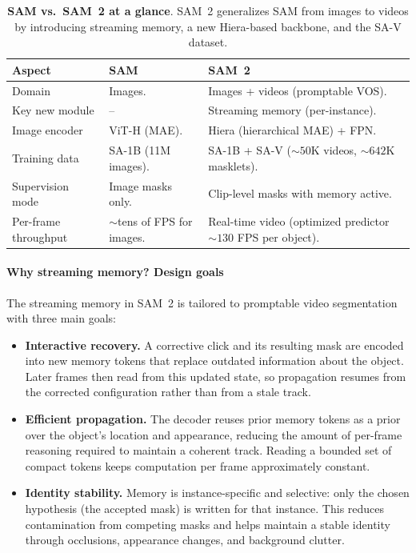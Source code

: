 \begin{enrichment}
\begin{enrichment}
		\begin{table}[H]
			\centering
			\caption{\textbf{SAM vs.\ SAM~2 at a glance}. SAM~2 generalizes SAM from images to videos by introducing streaming memory, a new Hiera-based backbone, and the SA-V dataset.}
			\label{tab:chapter15_sam_vs_sam2}
			\begin{tabular}{p{}p{0.32\textwidth}p{}}
				\toprule
				\textbf{Aspect} & \textbf{SAM~\cite{kirillov2023_sam}} & \textbf{SAM~2~\cite{ravi2024_sam2}} \\
				\midrule
				Domain & Images. & Images + videos (promptable VOS). \\
				Key new module & -- & Streaming memory (per-instance). \\
				Image encoder & ViT-H (MAE). & Hiera (hierarchical MAE) + FPN. \\
				Training data & SA-1B (11M images). & SA-1B + SA-V (\(\sim 50\)K videos, \(\sim 642\)K masklets). \\
				Supervision mode & Image masks only. & Clip-level masks with memory active. \\
				Per-frame throughput & \(\sim\)tens of FPS for images. & Real-time video (optimized predictor \(\sim 130\) FPS per object). \\
				\bottomrule
			\end{tabular}
		\end{table}
		
		\paragraph{Why streaming memory? Design goals}
		The streaming memory in SAM~2 is tailored to promptable video segmentation with three main goals:
		\begin{itemize}
			\item \textbf{Interactive recovery.} A corrective click and its resulting mask are encoded into new memory tokens that replace outdated information about the object. Later frames then read from this updated state, so propagation resumes from the corrected configuration rather than from a stale 
			track.
			
			\newpage
			
			\item \textbf{Efficient propagation.} The decoder reuses prior memory tokens as a prior over the object’s location and appearance, reducing the amount of per-frame reasoning required to maintain a coherent track. Reading a bounded set of compact tokens keeps computation per frame approximately constant.
			\item \textbf{Identity stability.} Memory is instance-specific and selective: only the chosen hypothesis (the accepted mask) is written for that instance. This reduces contamination from competing masks and helps maintain a stable identity through occlusions, appearance changes, and background clutter.
		\end{itemize}
		

\end{enrichment}
\end{enrichment}
